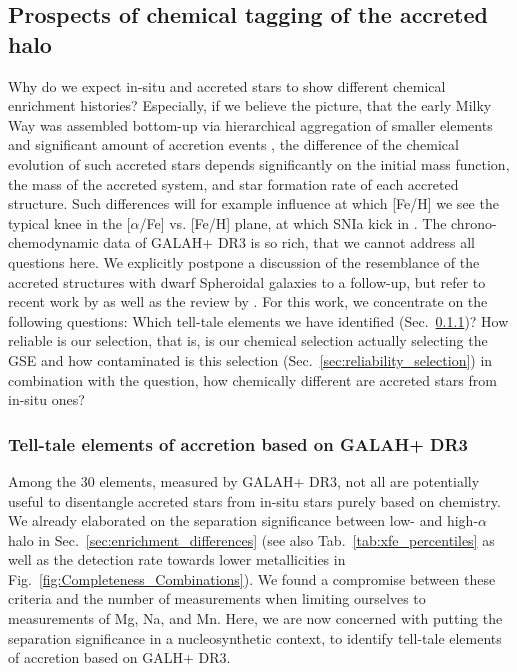 \documentclass[fleqn,usenatbib]{mnras}
\begin{document}
\subsection{Prospects of chemical tagging of the accreted halo} \label{sec:prospects_chem_tagg}

Why do we expect in-situ and accreted stars to show different chemical enrichment histories? Especially, if we believe the picture, that the early Milky Way was assembled bottom-up via hierarchical aggregation of smaller elements and significant amount of accretion events \citep[e.g.][]{Searle1978}, the difference of the chemical evolution of such accreted stars depends significantly on the initial mass function, the mass of the accreted system, and star formation rate of each accreted structure. Such differences will for example influence at which [Fe/H] we see the typical knee in the [$\alpha$/Fe] vs. [Fe/H] plane, at which SNIa kick in \citep[e.g.][]{McWilliam1997, Matteucci2021}. The chrono-chemodynamic data of GALAH+ DR3 is so rich, that we cannot address all questions here. We explicitly postpone a discussion of the resemblance of the accreted structures with dwarf Spheroidal galaxies to a follow-up, but refer to recent work by \citet{Hayes2018} as well as the review by \citet{Nissen2018}. For this work, we concentrate on the following questions: Which tell-tale elements we have identified (Sec.~\ref{sec:tell_tale})? How reliable is our selection, that is, is our chemical selection actually selecting the GSE and how contaminated is this selection (Sec.~\ref{sec:reliability_selection}) in combination with the question, how chemically different are accreted stars from in-situ ones?

\subsubsection{Tell-tale elements of accretion based on GALAH+ DR3} \label{sec:tell_tale}

Among the 30 elements, measured by GALAH+ DR3, not all are potentially useful to disentangle accreted stars from in-situ stars purely based on chemistry. We already elaborated on the separation significance between low- and high-$\alpha$ halo in Sec.~\ref{sec:enrichment_differences} (see also Tab.~\ref{tab:xfe_percentiles} as well as the detection rate towards lower metallicities in Fig.~\ref{fig:Completeness_Combinations}). We found a compromise between these criteria and the number of measurements when limiting ourselves to measurements of Mg, Na, and Mn. Here, we are now concerned with putting the separation significance in a nucleosynthetic context, to identify tell-tale elements of accretion based on GALH+ DR3.
\end{document}
